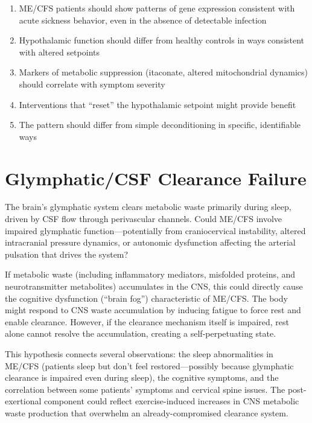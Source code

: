 \begin{enumerate}
    \item ME/CFS patients should show patterns of gene expression consistent with acute sickness behavior, even in the absence of detectable infection
    \item Hypothalamic function should differ from healthy controls in ways consistent with altered setpoints
    \item Markers of metabolic suppression (itaconate, altered mitochondrial dynamics) should correlate with symptom severity
    \item Interventions that ``reset'' the hypothalamic setpoint might provide benefit
    \item The pattern should differ from simple deconditioning in specific, identifiable ways
\end{enumerate}


\section{Glymphatic/CSF Clearance Failure}
\label{sec:glymphatic}

\begin{open_question}
The brain's glymphatic system clears metabolic waste primarily during sleep, driven by CSF flow through perivascular channels. Could ME/CFS involve impaired glymphatic function---potentially from craniocervical instability, altered intracranial pressure dynamics, or autonomic dysfunction affecting the arterial pulsation that drives the system?

If metabolic waste (including inflammatory mediators, misfolded proteins, and neurotransmitter metabolites) accumulates in the CNS, this could directly cause the cognitive dysfunction (``brain fog'') characteristic of ME/CFS. The body might respond to CNS waste accumulation by inducing fatigue to force rest and enable clearance. However, if the clearance mechanism itself is impaired, rest alone cannot resolve the accumulation, creating a self-perpetuating state.

This hypothesis connects several observations: the sleep abnormalities in ME/CFS (patients sleep but don't feel restored---possibly because glymphatic clearance is impaired even during sleep), the cognitive symptoms, and the correlation between some patients' symptoms and cervical spine issues. The post-exertional component could reflect exercise-induced increases in CNS metabolic waste production that overwhelm an already-compromised clearance system.
\end{open_question}


